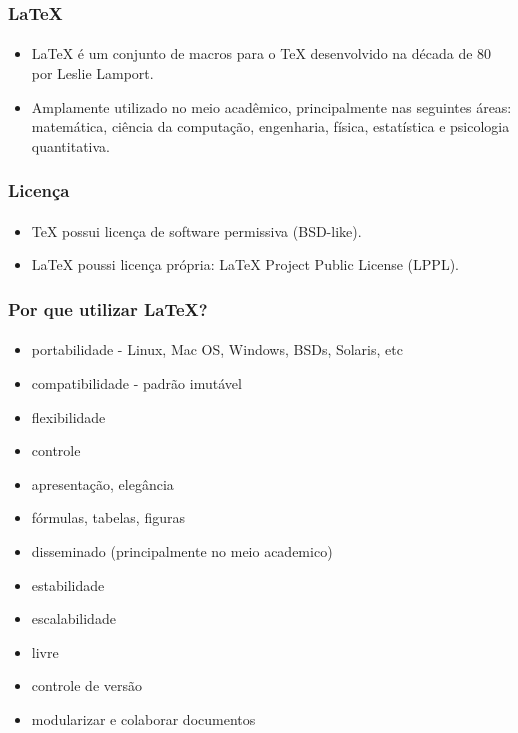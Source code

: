 \begin{frame}
\frametitle{\LaTeX{}}
\framesubtitle{}
\begin{itemize}
  \item \LaTeX{} é um conjunto de macros para o \TeX{} desenvolvido na década de 80 por Leslie Lamport.
  \item Amplamente utilizado no meio acadêmico, principalmente nas seguintes áreas: matemática, ciência da computação, engenharia, física, estatística e psicologia quantitativa.
\end{itemize}
\end{frame}



\begin{frame}
\frametitle{Licença}
\framesubtitle{}
\begin{itemize}
  \item \TeX{} possui licença de software permissiva (BSD-like).
  \item \LaTeX{} poussi licença própria: \LaTeX{} Project Public License (LPPL).
\end{itemize}
\end{frame}


\begin{frame}
\frametitle{Por que utilizar \LaTeX{}?}
\framesubtitle{}
\begin{itemize}
  \item portabilidade - Linux, Mac OS, Windows, BSDs, Solaris, etc
  \item compatibilidade - padrão imutável
  \item flexibilidade
  \item controle
  \item apresentação, elegância
  \item fórmulas, tabelas, figuras
  \item disseminado (principalmente no meio academico)
  \item estabilidade
  \item escalabilidade
  \item livre
  \item controle de versão
  \item modularizar e colaborar documentos
\end{itemize}
\end{frame}


